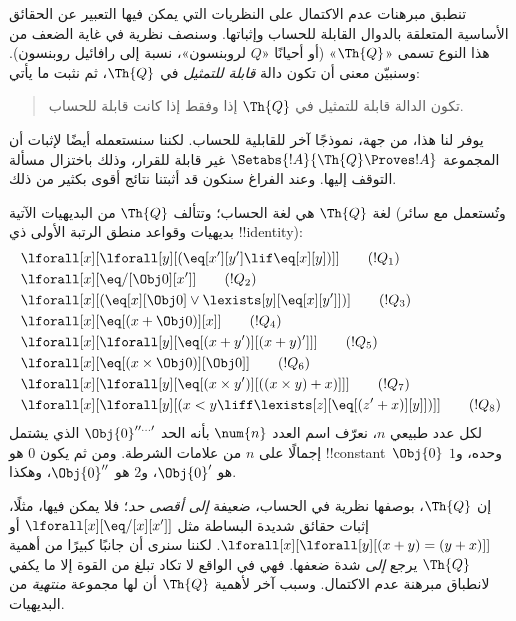 \documentclass[../../../include/open-logic-section]{subfiles}
\begin{document}

تنطبق مبرهنات عدم الاكتمال على النظريات التي يمكن فيها التعبير عن
الحقائق الأساسية المتعلقة بالدوال القابلة للحساب وإثباتها. وسنصف
نظرية في غاية الضعف من هذا النوع تسمى «$\Th{Q}$» (أو أحيانًا «$Q$
لروبنسون»، نسبة إلى رافائيل روبنسون). وسنبيّن معنى أن تكون دالة
\emph{قابلة للتمثيل} في $\Th{Q}$، ثم نثبت ما يأتي:
\begin{quote}
  تكون الدالة قابلة للتمثيل في $\Th{Q}$ إذا وفقط إذا كانت قابلة للحساب.
\end{quote}
يوفر لنا هذا، من جهة، نموذجًا آخر للقابلية للحساب. لكننا سنستعمله أيضًا
لإثبات أن المجموعة $\Setabs{!A}{\Th{Q}\Proves !A}$ غير قابلة للقرار،
وذلك باختزال مسألة التوقف إليها. وعند الفراغ سنكون قد أثبتنا نتائج أقوى
بكثير من ذلك.

لغة $\Th{Q}$ هي لغة الحساب؛ وتتألف $\Th{Q}$ من البديهيات الآتية
(وتُستعمل مع سائر بديهيات وقواعد منطق الرتبة الأولى ذي !!{identity}):
\begin{align*}
& \lforall[x][\lforall[y][(\eq[x'][y'] \lif \eq[x][y])]] \tag{$!Q_1$}\\
& \lforall[x][\eq/[\Obj 0][x']] \tag{$!Q_2$}\\
& \lforall[x][(\eq[x][\Obj 0] \lor \lexists[y][\eq[x][y']])] \tag{$!Q_3$}\\
& \lforall[x][\eq[(x + \Obj 0)][x]] \tag{$!Q_4$}\\
& \lforall[x][\lforall[y][\eq[(x + y')][(x + y)']]] \tag{$!Q_5$}\\
& \lforall[x][\eq[(x \times \Obj 0)][\Obj 0]] \tag{$!Q_6$}\\
& \lforall[x][\lforall[y][\eq[(x \times y')][((x \times y) + x)]]] \tag{$!Q_7$}\\
& \lforall[x][\lforall[y][(x < y \liff \lexists[z][\eq[(z' + x)][y]])]] \tag{$!Q_8$}
\end{align*}
لكل عدد طبيعي $n$، نعرّف اسم العدد $\num{n}$ بأنه الحد
$\Obj{0}^{\prime\prime\ldots\prime}$ الذي يشتمل إجمالًا على $n$ من
علامات الشرطة. ومن ثم يكون $\num{0}$ هو !!{constant}~$\Obj{0}$ وحده،
و$\num{1}$ هو $\Obj{0}'$، و$\num{2}$ هو $\Obj{0}''$، وهكذا.

إن $\Th{Q}$، بوصفها نظرية في الحساب، ضعيفة \emph{إلى أقصى حد}؛ فلا
يمكن فيها، مثلًا، إثبات حقائق شديدة البساطة مثل
$\lforall[x][\eq/[x][x']]$ أو
$\lforall[x][\lforall[y][(x+y)=(y+x)]]$. لكننا سنرى أن جانبًا كبيرًا من
أهمية $\Th{Q}$ يرجع \emph{إلى} شدة ضعفها. فهي في الواقع لا تكاد تبلغ
من القوة إلا ما يكفي لانطباق مبرهنة عدم الاكتمال. وسبب آخر لأهمية
$\Th{Q}$ أن لها مجموعة \emph{منتهية} من البديهيات.
\end{document}
